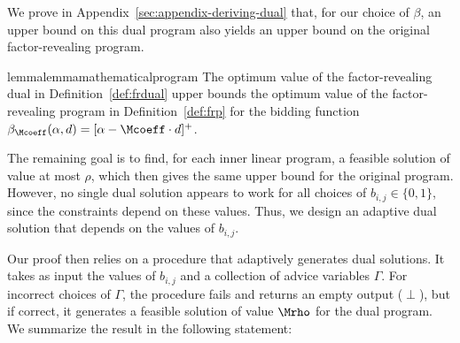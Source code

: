 We prove in Appendix~\ref{sec:appendix-deriving-dual} that, for our choice of $\beta$, an upper bound on this dual program also yields an upper bound on the original factor-revealing program.
\begin{restatable}{lemma}{lemmamathematicalprogram}\label{lemma:mathematical-program-1.99}
    The optimum value of the factor-revealing dual in Definition~\ref{def:frdual} upper bounds the optimum value of the factor-revealing program in Definition~\ref{def:frp} for the bidding function $\beta_{\Mcoeff}(\alpha, d) = [\alpha - \Mcoeff \cdot d]^+$.
\end{restatable}


The remaining goal is to find, for each inner linear program, a feasible solution of value at most $\rho$, which then gives the same upper bound for the original program. However, no single dual solution appears to work for all choices of $b_{i,j}\in\{0,1\}$, since the constraints depend on these values. 
Thus, we design an adaptive dual solution that depends on the values of $b_{i,j}$.

Our proof then relies on a procedure that adaptively generates dual solutions. It takes as input the values of $b_{i,j}$ and a collection of advice variables $\Gamma$.  
For incorrect choices of $\Gamma$, the procedure fails and returns an empty output ($\perp$), but if correct, it generates a feasible solution of value $\Mrho$ for the dual program.
We summarize the result in the following statement:


